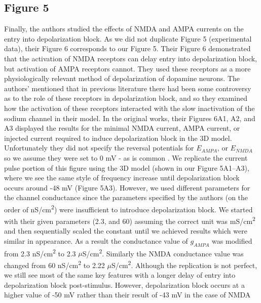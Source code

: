 \subsection{Figure 5}
Finally, the authors studied the effects of NMDA and AMPA currents on the entry into depolarization block. As we did not duplicate Figure 5 (experimental data), their Figure 6 corresponds to our Figure 5. Their Figure 6 demonstrated that the activation of NMDA receptors can delay entry into depolarization block, but activation of AMPA receptors cannot. They used these receptors as a more physiologically relevant method of depolarization of dopamine neurons. The authors’ mentioned that in previous literature there had been some controversy as to the role of these receptors in depolarization block, and so they examined how the activation of these receptors interacted with the slow inactivation of the sodium channel in their model. In the original works, their Figures 6A1, A2, and A3 displayed the results for the minimal NMDA current, AMPA current, or injected current required to induce depolarization block in the 3D model. Unfortunately they did not specify the reversal potentials for $E_{AMPA}$, or $E_{NMDA}$ so we assume they were set to 0 mV - as is common \cite{neuroscience_2001}. We replicate the current pulse portion of this figure using the 3D model (shown in our Figure 5A1--A3), where we see the same style of frequency increase until depolarization block occurs around -48 mV (Figure 5A3). However, we used different parameters for the channel conductance since the parameters specified by the authors (on the order of nS/cm\textsuperscript{2}) were insufficient to introduce depolarization block. We started with their given parameters (2.3, and 60) assuming the correct unit was mS/cm\textsuperscript{2} and then sequentially scaled the constant until we achieved results which were similar in appearance. As a result the conductance value of $g_{AMPA}$ was modified from 2.3 nS/cm\textsuperscript{2} to 2.3 $\mu$S/cm\textsuperscript{2}. Similarly the NMDA conductance value was changed from 60 nS/cm\textsuperscript{2} to 2.22 $\mu$S/cm\textsuperscript{2}. Although the replication is not perfect, we still see most of the same key features with a longer delay of entry into depolarization block post-stimulus. However, depolarization block occurs at a higher value of -50 mV rather than their result of -43 mV in the case of NMDA

